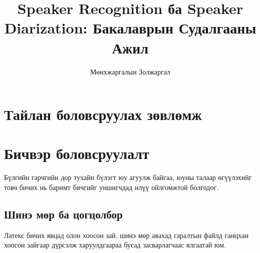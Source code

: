 \documentclass[12pt,A4]{report}
\begin{document}

\title{Speaker Recognition ба Speaker Diarization: Бакалаврын Судалгааны Ажил}
\author{Мөнхжаргалын Золжаргал}







\chapter{Тайлан боловсруулах зөвлөмж}


\chapter{Бичвэр боловсруулалт}
Бүлгийн гарчгийн дор тухайн бүлэгт юу агуулж байгаа, юуны талаар өгүүлэхийг товч бичих нь баримт бичгийг уншигчдад илүү ойлгомжтой болгодог.
\section{Шинэ мөр ба цогцолбор}
Латекс бичих явцад олон хоосон зай, шинэ мөр авахад гаралтын файлд ганцхан хоосон зайгаар дүрсэлж харуулдгаараа бусад засварлагчаас ялгаатай юм. 
\end{document}
